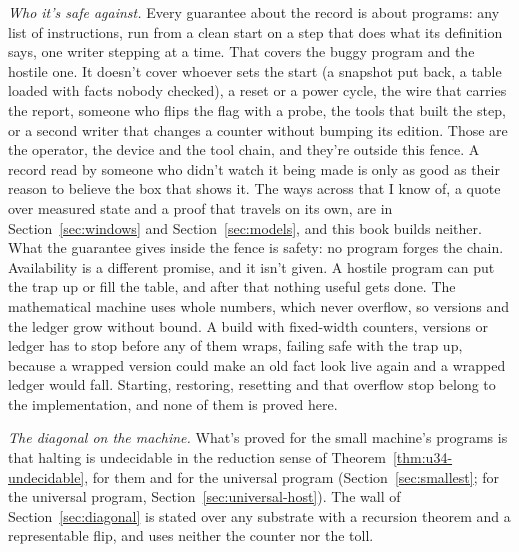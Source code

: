 \documentclass[11pt,twoside]{article}
\theoremstyle{thielethm}
\theoremstyle{thieledef}
\theoremstyle{thieledef}
\theoremstyle{thieledef}
\theoremstyle{thielethm}
\theoremstyle{thieleobs}
\theoremstyle{thielethm}
\begin{document}
\emph{Who it's safe against.} Every guarantee about the record is about programs: any list of
instructions, run from a clean start on a step that does what its definition says, one writer
stepping at a time. That covers the buggy program and the hostile one. It doesn't cover whoever
sets the start (a snapshot put back, a table loaded with facts nobody checked), a reset or a
power cycle, the wire that carries the report, someone who
flips the flag with a probe, the tools that built the step, or a second writer that changes a
counter without bumping its edition. Those are the operator, the device and the tool chain,
and they're outside this fence. A record read by someone who didn't watch it being made is only
as good as their reason to believe the box that shows it. The ways across that I know of, a quote
over measured state and a proof that travels on its own, are in Section~\ref{sec:windows} and
Section~\ref{sec:models}, and this book builds neither.
What the guarantee gives inside the fence is safety: no program forges the chain. Availability is
a different promise, and it isn't given. A hostile program can put the trap up or fill the table,
and after that nothing useful gets done. The mathematical machine uses whole numbers, which never
overflow, so versions and the ledger grow without bound. A build with fixed-width counters,
versions or ledger has to stop before any of them wraps, failing safe with the trap up, because a
wrapped version could make an old fact look live again and a wrapped ledger would fall.
Starting, restoring, resetting and that overflow stop belong to the implementation, and none of
them is proved here.

\emph{The diagonal on the machine.} What's proved for the small machine's programs is that
halting is undecidable in the reduction sense of Theorem~\ref{thm:u34-undecidable}, for them and for the universal program
(Section~\ref{sec:smallest}; for the universal program, Section~\ref{sec:universal-host}). The
wall of Section~\ref{sec:diagonal} is stated over any substrate with a recursion theorem and a
representable flip, and uses neither the counter nor the toll.
\end{document}
